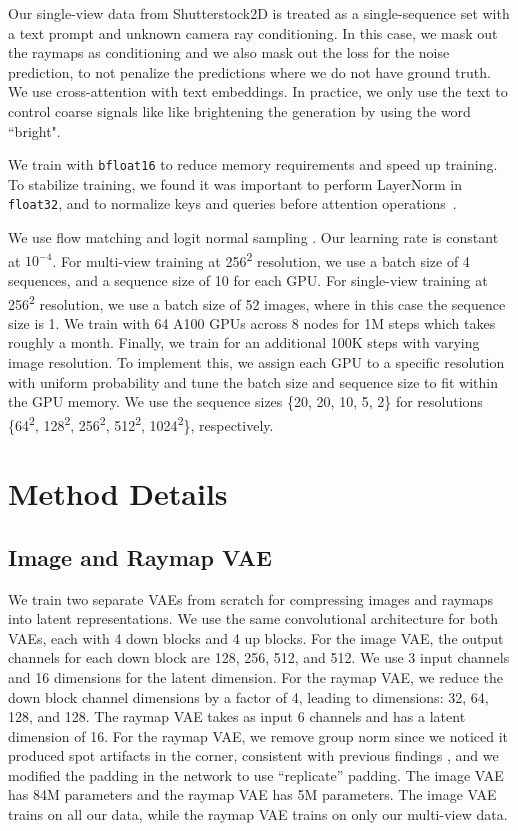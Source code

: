 Our single-view data from Shutterstock2D is treated as a single-sequence set with a text prompt and unknown camera ray conditioning.
In this case, we mask out the raymaps as conditioning and we also mask out the loss for the noise prediction, to not penalize the predictions where we do not have ground truth.
We use cross-attention with text embeddings.
In practice, we only use the text to control coarse signals like like brightening the generation by using the word ``bright".

We train with \texttt{bfloat16} to reduce memory requirements and speed up training.
To stabilize training, we found it was important to perform LayerNorm in \texttt{float32}, and to normalize keys and queries before attention operations~\cite{esser2024scaling}.

We use flow matching and logit normal sampling \cite{esser2024scaling}.
Our learning rate is constant at $10^{-4}$.
For multi-view training at 256\textsuperscript{2} resolution, we use a batch size of 4 sequences, and a sequence size of 10 for each GPU.
For single-view training at 256\textsuperscript{2} resolution, we use a batch size of 52 images, where in this case the sequence size is 1.
We train with 64 A100 GPUs across 8 nodes for 1M steps which takes roughly a month.
Finally, we train for an additional 100K steps with varying image resolution.
To implement this, we assign each GPU to a specific resolution with uniform probability and tune the batch size and sequence size to fit within the GPU memory. We use the sequence sizes \{20, 20, 10, 5, 2\} for resolutions \{64\textsuperscript{2}, 128\textsuperscript{2}, 256\textsuperscript{2}, 512\textsuperscript{2}, 1024\textsuperscript{2}\}, respectively.


\section{Method Details}

\subsection{Image and Raymap VAE}

We train two separate VAEs from scratch for compressing images and raymaps into latent representations.
We use the same convolutional architecture \cite{rombach2022high} for both VAEs, each with 4 down blocks and 4 up blocks.
For the image VAE, the output channels for each down block are 128, 256, 512, and 512.
We use 3 input channels and 16 dimensions for the latent dimension.
For the raymap VAE, we reduce the down block channel dimensions by a factor of 4, leading to dimensions: 32, 64, 128, and 128.
The raymap VAE takes as input 6 channels and has a latent dimension of 16.
For the raymap VAE, we remove group norm since we noticed it produced spot artifacts in the corner, consistent with previous findings \cite{MovieGen2024}, and we modified the padding in the network to use ``replicate'' padding.
The image VAE has 84M parameters and the raymap VAE has 5M parameters. The image VAE trains on all our data, while the raymap VAE trains on only our multi-view data.

